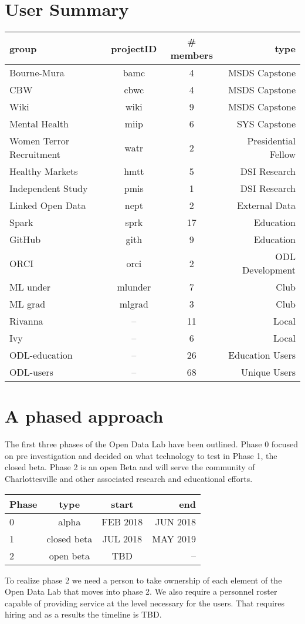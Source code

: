\section{User Summary}
\begin{center}
\begin{tabular}{lccr}
\hline
\hline
group & projectID & \# members & type \\
\hline
\hline
Bourne-Mura & bamc & 4 & MSDS Capstone \\
CBW & cbwc & 4 & MSDS Capstone\\
Wiki & wiki & 9 & MSDS Capstone\\
Mental Health & miip & 6 & SYS Capstone\\
\hline
Women Terror Recruitment & watr & 2 & Presidential Fellow\\
\hline
Healthy Markets & hmtt & 5 & DSI Research\\
Independent Study & pmis & 1 & DSI Research\\
\hline
Linked Open Data   & nept & 2 & External Data\\
\hline
Spark & sprk & 17 & Education \\
GitHub & gith & 9 & Education \\
\hline
ORCI & orci & 2 & ODL Development\\
\hline
ML under & mlunder & 7 & Club\\
ML grad & mlgrad & 3 & Club\\
\hline
Rivanna & -- & 11 & Local\\
Ivy & -- & 6 & Local\\
\hline
\hline
ODL-education  & -- & 26 & Education Users\\
ODL-users & -- & 68 & Unique Users\\
\hline
\hline
\end{tabular}
\end{center}

\section{A phased approach}
\label{phases}
The first three phases of the Open Data Lab have been outlined. Phase 0 focused on pre investigation and decided on what technology to test in Phase 1, the closed beta. Phase 2 is an open Beta and will serve the community of Charlottesville and other associated research and educational efforts.
\begin{center}
\begin{tabular}{lccr}
\hline
\hline
Phase & type & start & end \\
\hline
0 & alpha & FEB 2018 & JUN 2018\\
1 & closed beta & JUL 2018 & MAY 2019 \\
2 & open beta & TBD & -- \\
\hline
\hline
\end{tabular}
\end{center}
To realize phase 2 we need a person to take ownership of each element of the Open Data Lab that moves into phase 2. We also require a personnel roster capable of providing service at the level necessary for the users. That requires hiring and as a results the timeline is TBD.

